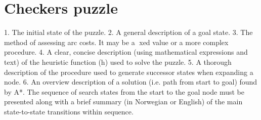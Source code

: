 \documentclass{article}
\begin{document}
\section{Checkers puzzle}

1. The initial state of the puzzle.
2. A general description of a goal state.
3. The method of assessing arc costs. It may be a xed value or a more complex procedure.
4. A clear, concise description (using mathematical expressions and text) of the heuristic function (h)
used to solve the puzzle.
5. A thorough description of the procedure used to generate successor states when expanding a node.
6. An overview description of a solution (i.e. path from start to goal) found by A*. The sequence of search
states from the start to the goal node must be presented along with a brief summary (in Norwegian or
English) of the main state-to-state transitions within sequence.
\end{document}
